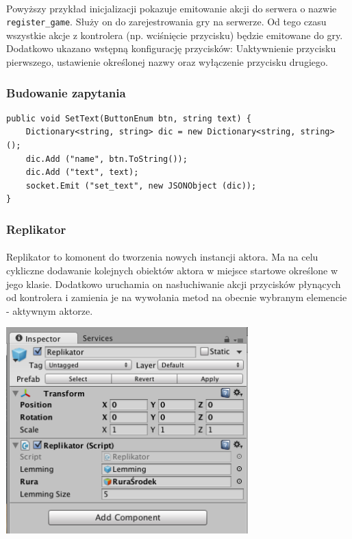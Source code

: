 \paragraph{}
Powyższy przykład inicjalizacji pokazuje emitowanie akcji do serwera o nazwie \texttt{register\_game}. Służy on do zarejestrowania gry na serwerze. Od tego czasu wszystkie akcje z kontrolera (np. wciśnięcie przycisku) będzie emitowane do gry.
Dodatkowo ukazano wstępną konfigurację przycisków: Uaktywnienie przycisku pierwszego, ustawienie określonej nazwy oraz wyłączenie przycisku drugiego.

\subsubsection{Budowanie zapytania}

\begin{lstlisting}[language=CSharp]
public void SetText(ButtonEnum btn, string text) {
	Dictionary<string, string> dic = new Dictionary<string, string> ();
	dic.Add ("name", btn.ToString());
	dic.Add ("text", text);
	socket.Emit ("set_text", new JSONObject (dic));
}
\end{lstlisting}

\subsubsection{Replikator}
\paragraph{}
Replikator to komonent do tworzenia nowych instancji aktora. Ma na celu cykliczne dodawanie kolejnych obiektów aktora w miejsce startowe określone w jego klasie. Dodatkowo uruchamia on nasłuchiwanie akcji przycisków płynących od kontrolera i zamienia je na wywołania metod na obecnie wybranym elemencie - aktywnym aktorze.

\begin{center}
\includegraphics[width=0.7\textwidth]{images/replikator.png}
\end{center}

